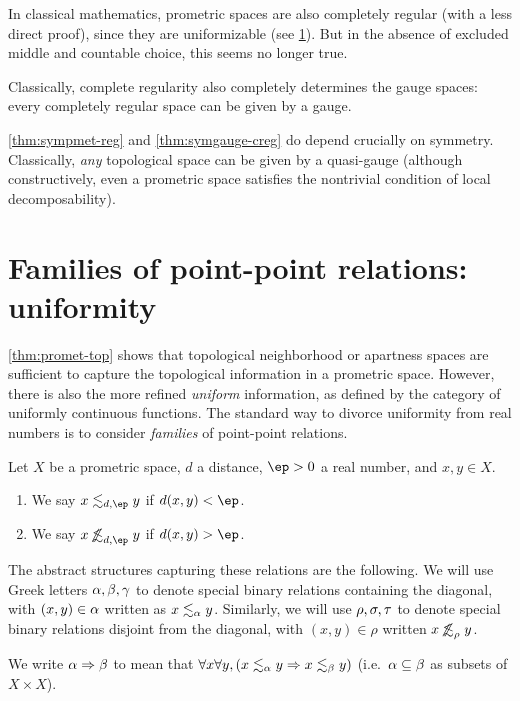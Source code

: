 \documentclass{article}
\def\oapt{\mathrel{\!\not\,\not\lesssim}}
\def\leapx{\lesssim}
\let\implies\Rightarrow
\begin{document}
In classical mathematics, prometric spaces are also completely regular (with a less direct proof), since they are uniformizable (see \cref{sec:uniformity}).
But in the absence of excluded middle and countable choice, this seems no longer true.

Classically, complete regularity also completely determines the gauge spaces: every completely regular space can be given by a gauge.

\cref{thm:sympmet-reg} and \cref{thm:symgauge-creg} do depend crucially on symmetry.
Classically, \emph{any} topological space can be given by a quasi-gauge (although constructively, even a prometric space satisfies the nontrivial condition of local decomposability).


\section{Families of point-point relations: uniformity}
\label{sec:uniformity}

\cref{thm:promet-top} shows that topological neighborhood or apartness spaces are sufficient to capture the topological information in a prometric space.
However, there is also the more refined \emph{uniform} information, as defined by the category of uniformly continuous functions.
The standard way to divorce uniformity from real numbers is to consider \emph{families} of point-point relations.

\begin{defn}\label{def:pmet-unif}
  Let $X$ be a prometric space, $d$ a distance, $\ep>0$ a real number, and $x,y\in X$.
  \begin{enumerate}
  \item We say $x \leapx_{d,\ep} y$ if $d(x,y)<\ep$.
  \item We say $x \oapt_{d,\ep} y$ if $d(x,y)>\ep$.
  \end{enumerate}
\end{defn}

The abstract structures capturing these relations are the following.
We will use Greek letters $\alpha,\beta,\gamma$ to denote special binary relations containing the diagonal, with $(x,y)\in \alpha$ written as $x\leapx_\al y$.
Similarly, we will use $\rho,\sigma,\tau$ to denote special binary relations disjoint from the diagonal, with $
(x,y)\in\rho$ written $x \oapt_\rho y$.

We write $\al\implies\be$ to mean that $\forall x\forall y,(x\leapx_\al y \implies x\leapx_\be y)$ (i.e.\ $\alpha\subseteq \beta$ as subsets of $X\times X$).
\end{document}
